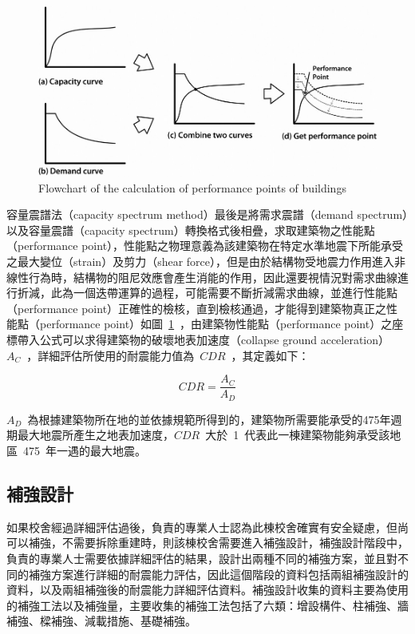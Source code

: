\begin{figure}[hbtp]
  \begin{center}
    \includegraphics[width=1.0\textwidth]{figures/performance-point.png}
    \caption{Flowchart of the calculation of performance points of buildings} 
    \label{fig:performance-point}
  \end{center}
\end{figure}

容量震譜法（capacity spectrum method）最後是將需求震譜（demand spectrum）以及容量震譜（capacity spectrum）轉換格式後相疊，求取建築物之性能點（performance point），性能點之物理意義為該建築物在特定水準地震下所能承受之最大變位（strain）及剪力（shear force），但是由於結構物受地震力作用進入非線性行為時，結構物的阻尼效應會產生消能的作用，因此還要視情況對需求曲線進行折減，此為一個迭帶運算的過程，可能需要不斷折減需求曲線，並進行性能點（performance point）正確性的檢核，直到檢核通過，才能得到建築物真正之性能點（performance point）如圖~\ref{fig:performance-point}~，由建築物性能點（performance point）之座標帶入公式可以求得建築物的破壞地表加速度（collapse ground acceleration）~$A_C$~，詳細評估所使用的耐震能力值為~$CDR$~，其定義如下：


\begin{equation} CDR = \dfrac{A_C}{A_D} \label{eq:CDR}\end{equation} 

$A_D$~為根據建築物所在地的並依據規範所得到的，建築物所需要能承受的475年週期最大地震所產生之地表加速度，$CDR$~大於~1~代表此一棟建築物能夠承受該地區~475~年一遇的最大地震。

\subsection{補強設計}

如果校舍經過詳細評估過後，負責的專業人士認為此棟校舍確實有安全疑慮，但尚可以補強，不需要拆除重建時，則該棟校舍需要進入補強設計，補強設計階段中，負責的專業人士需要依據詳細評估的結果，設計出兩種不同的補強方案，並且對不同的補強方案進行詳細的耐震能力評估，因此這個階段的資料包括兩組補強設計的資料，以及兩組補強後的耐震能力詳細評估資料。補強設計收集的資料主要為使用的補強工法以及補強量，主要收集的補強工法包括了六類：增設構件、柱補強、牆補強、樑補強、減載措施、基礎補強。

